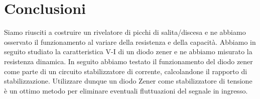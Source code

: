 \section{Conclusioni}

Siamo riusciti a costruire un rivelatore di picchi di salita/discesa e ne abbiamo osservato il funzionamento al variare della resistenza e della capacità.
Abbiamo in seguito studiato la caratteristica V-I di un diodo zener e ne abbiamo misurato la resistenza dinamica. In seguito abbiamo testato il funzionamento del diodo zener come parte di un circuito stabilizzatore di corrente, calcolandone il rapporto di stabilizzazione. Utilizzare dunque un diodo Zener come stabilizzatore di tensione è un ottimo metodo per eliminare eventuali fluttuazioni del segnale in ingresso.